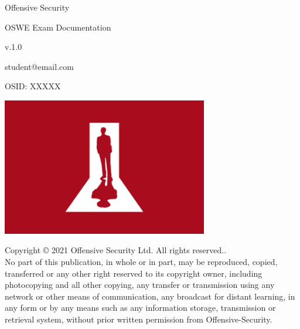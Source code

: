 \documentclass[a4paper]{article}
\begin{document}
\begin{titlepage}
  \begin{center}
      \vspace*{1cm}
          
      
      {\fontsize{48}{48}\selectfont \textcolor{myblue}{Offensive Security}}
          
      \vspace{0.5cm}
      {\fontsize{28}{28}\selectfont \textcolor{myblue}{OSWE Exam Documentation}}
          
      \vspace{1.5cm}
          
      v.1.0

      \vspace{1cm}

      {\fontsize{16}{16}\selectfont student@email.com}

      \vspace{1cm}

      {\fontsize{20}{20}\selectfont OSID: XXXXX}

      \vfill
          
      \includegraphics[width=9cm]{offsec.png}

      \vfill
      
          
      Copyright © 2021 Offensive Security Ltd. All rights reserved..\\
      No part of this publication, in whole or in part, may be reproduced, copied, transferred or any other right reserved to its copyright owner, 
      including photocopying and all other copying, any transfer or transmission using any network or other means of communication, any broadcast
       for distant learning, in any form or by any means such as any information storage, transmission or retrieval system, without prior written
        permission from Offensive-Security.
      
          
      \vspace{0.8cm}
  
  \end{center}
  \thispagestyle{fancy}
\end{titlepage}
\end{document}
